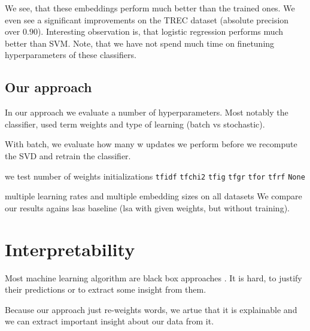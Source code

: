     
    We see, that these embeddings perform much better than the trained ones. 
    We even see a significant improvements on the TREC dataset (absolute precision over $0.90$).
    Interesting observation is, that logistic regression performs much better than SVM.
    Note, that we have not spend much time on finetuning hyperparameters of these classifiers. 

    
    \subsection{Our approach}
    
    In our approach we evaluate a number of hyperparameters. Most notably the classifier, used term weights and type of learning (batch vs stochastic).
    
    With batch, we evaluate how many w updates we perform before we recompute the SVD and retrain the classifier.
    
    \* %
    we test number of weights
    initializations
    \texttt{tfidf} \texttt{tfchi2} \texttt{tfig} \texttt{tfgr} \texttt{tfor} \texttt{tfrf} \texttt{None}

    multiple learning rates and multiple embedding sizes on all datasets
    We compare our results agains lsas baseline (lsa with given weights, but without training).
    


\section{Interpretability}
    Most machine learning algorithm are black box approaches \cite{ribeiro2016should}. %
    It is hard, to justify their predictions or to extract some insight from them. 
    
    Because our approach just re-weights words, we artue that it is explainable and we can extract important insight about our data from it.

